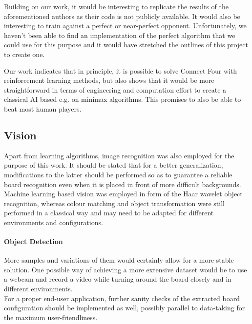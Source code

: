 \documentclass[10pt,twocolumn,letterpaper]{article}
\begin{document}
Building on our work, it would be interesting to replicate the results of the aforementioned
authors as their code is not publicly available.
It would also be interesting to train against a perfect or near-perfect opponent.
Unfortunately, we haven't been able to find an implementation of the perfect algorithm that we could use for this purpose and it would have stretched the outlines of this project to create one.

Our work indicates that in principle, it is possible to solve Connect Four with
reinforcement learning methods, but also shows that it would be more straightforward in terms of engineering and computation effort to create a classical AI based e.g. on minimax algorithms. This promises to also be able to beat most human players.

\subsection{Vision}
Apart from learning algorithms, image recognition was also employed for the purpose of this work. It should be stated that for a better generalization, modifications to the latter should be performed so as to guarantee a reliable board recognition even when it is placed in front of more difficult backgrounds.
Machine learning based vision was employed in form of the Haar wavelet object recognition, whereas colour matching and object transformation were still performed in a classical way and may need to be adapted for different environments and configurations.
\paragraph{Object Detection}
More samples and variations of them would certainly allow for a more stable solution. 
One possible way of achieving a more extensive dataset would be to use a webcam and record a video while turning around the board closely and in different environments.\\
For a proper end-user application, further sanity checks of the extracted board configuration should be implemented as well, possibly parallel to data-taking for the maximum user-friendliness.


{\small
\printbibliography
}
\end{document}
